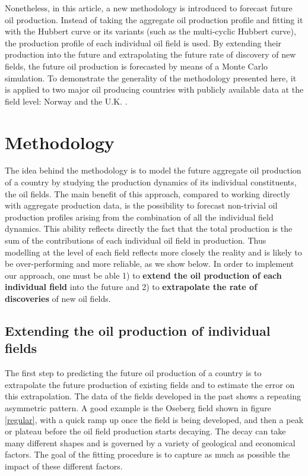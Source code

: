 \documentclass[review]{elsarticle}
\begin{document}
Nonetheless, in this article, a new methodology is introduced to forecast future
oil production. Instead of taking the aggregate oil production profile
and fitting it with the Hubbert curve or its variants (such as the
multi-cyclic Hubbert curve), the production profile of each individual
oil field is used. By extending their production into the future and
extrapolating the future rate of discovery of new fields, the future
oil production is forecasted by means of a Monte Carlo simulation.
To demonstrate the generality of the methodology presented here,
it is applied to two major oil producing countries with publicly available
data at the field level: Norway  and the U.K. \citep{GOVUK2014}.


\section{Methodology}

The idea behind the methodology is to model the future aggregate oil
production of a country by studying the production dynamics of its
individual constituents, the oil fields. The main benefit of this
approach, compared to working directly with aggregate production data,
is the possibility to forecast non-trivial oil production profiles
arising from the combination of all the individual field
dynamics. This ability reflects directly the fact that the total
production is the sum of the contributions of each individual
oil field in production. Thus modelling at the level of each field
reflects more closely the reality and is likely to be over-performing
and more reliable, as we show below.
In order to implement our approach, one must be able 1) to \textbf{extend
the oil production of each individual field} into the future and 2)
to \textbf{extrapolate the rate of discoveries} of new oil fields.


\subsection{Extending the oil production of individual fields}

The first step to predicting the future oil production of a country
is to extrapolate the future production of existing fields and to
estimate the error on this extrapolation. The data of the fields developed
in the past shows a repeating asymmetric pattern. A good example is
the Oseberg field shown in figure \ref{regular}, with a quick ramp
up once the field is being developed, and then a peak or plateau before
the oil field production starts decaying. The decay can take many different shapes and is governed by a variety of geological and economical factors.
The goal of the fitting procedure is to capture as much as possible the impact of
these different factors.
\end{document}
